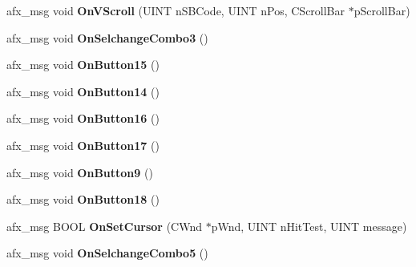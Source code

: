 \begin{DoxyCompactItemize}
\item 
\hypertarget{class_c_wavfrag_dlg_a09ecf8368cedebee691044c91b628610}{afx\-\_\-msg void {\bfseries On\-V\-Scroll} (U\-I\-N\-T n\-S\-B\-Code, U\-I\-N\-T n\-Pos, C\-Scroll\-Bar $\ast$p\-Scroll\-Bar)}\label{class_c_wavfrag_dlg_a09ecf8368cedebee691044c91b628610}

\item 
\hypertarget{class_c_wavfrag_dlg_a0d4dbefb2e1942fbe5c836d287b82b11}{afx\-\_\-msg void {\bfseries On\-Selchange\-Combo3} ()}\label{class_c_wavfrag_dlg_a0d4dbefb2e1942fbe5c836d287b82b11}

\item 
\hypertarget{class_c_wavfrag_dlg_adbf82962f6732c81269d3e5bd886220f}{afx\-\_\-msg void {\bfseries On\-Button15} ()}\label{class_c_wavfrag_dlg_adbf82962f6732c81269d3e5bd886220f}

\item 
\hypertarget{class_c_wavfrag_dlg_adff0fe94e6917dcea0678f88ccf5718c}{afx\-\_\-msg void {\bfseries On\-Button14} ()}\label{class_c_wavfrag_dlg_adff0fe94e6917dcea0678f88ccf5718c}

\item 
\hypertarget{class_c_wavfrag_dlg_a4a29bfce83eed05beb4eae9fbc8128b6}{afx\-\_\-msg void {\bfseries On\-Button16} ()}\label{class_c_wavfrag_dlg_a4a29bfce83eed05beb4eae9fbc8128b6}

\item 
\hypertarget{class_c_wavfrag_dlg_a7662625edc39516f6fd4601219e13539}{afx\-\_\-msg void {\bfseries On\-Button17} ()}\label{class_c_wavfrag_dlg_a7662625edc39516f6fd4601219e13539}

\item 
\hypertarget{class_c_wavfrag_dlg_a17bcb9ab6111edf452a196b4561f3fe1}{afx\-\_\-msg void {\bfseries On\-Button9} ()}\label{class_c_wavfrag_dlg_a17bcb9ab6111edf452a196b4561f3fe1}

\item 
\hypertarget{class_c_wavfrag_dlg_a7a3e9560c0f8cd8f8e6ba78c3ea002db}{afx\-\_\-msg void {\bfseries On\-Button18} ()}\label{class_c_wavfrag_dlg_a7a3e9560c0f8cd8f8e6ba78c3ea002db}

\item 
\hypertarget{class_c_wavfrag_dlg_a7e9f73eae3b24da5034ee144cb6b62a3}{afx\-\_\-msg B\-O\-O\-L {\bfseries On\-Set\-Cursor} (C\-Wnd $\ast$p\-Wnd, U\-I\-N\-T n\-Hit\-Test, U\-I\-N\-T message)}\label{class_c_wavfrag_dlg_a7e9f73eae3b24da5034ee144cb6b62a3}

\item 
\hypertarget{class_c_wavfrag_dlg_ab67ddb1799fec8b7e05b40b1949eecb6}{afx\-\_\-msg void {\bfseries On\-Selchange\-Combo5} ()}\label{class_c_wavfrag_dlg_ab67ddb1799fec8b7e05b40b1949eecb6}


\end{DoxyCompactItemize}
